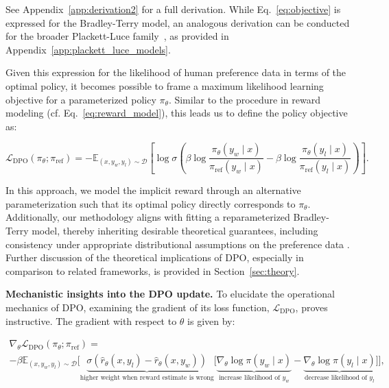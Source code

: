 See Appendix~\ref{app:derivation2} for a full derivation. While Eq.~\ref{eq:objective} is expressed for the Bradley-Terry model, an analogous derivation can be conducted for the broader Plackett-Luce family~\citep{plackett1975analysis, luce2012individual}, as provided in Appendix~\ref{app:plackett_luce_models}.

Given this expression for the likelihood of human preference data in terms of the optimal policy, it becomes possible to frame a maximum likelihood learning objective for a parameterized policy $\pi_\theta$. Similar to the procedure in reward modeling (cf. Eq.~\ref{eq:reward_model}), this leads us to define the policy objective as:

\begin{equation}\label{eq:optimum_model}
    \mathcal{L}_\text{DPO}(\pi_{\theta}; \pi_\text{ref}) = -\mathbb{E}_{(x, y_w, y_l)\sim \mathcal{D}}\left[\log \sigma \left(\beta \log \frac{\pi_{\theta}(y_w\mid x)}{\pi_\text{ref}(y_w\mid x)} - \beta \log \frac{\pi_{\theta}(y_l\mid x)}{\pi_\text{ref}(y_l\mid x)}\right)\right].
\end{equation}

In this approach, we model the implicit reward through an alternative parameterization such that its optimal policy directly corresponds to $\pi_\theta$. Additionally, our methodology aligns with fitting a reparameterized Bradley-Terry model, thereby inheriting desirable theoretical guarantees, including consistency under appropriate distributional assumptions on the preference data \cite{bong2022generalized}. Further discussion of the theoretical implications of DPO, especially in comparison to related frameworks, is provided in Section~\ref{sec:theory}.

\textbf{Mechanistic insights into the DPO update.} To elucidate the operational mechanics of DPO, examining the gradient of its loss function, $\mathcal{L}_\text{DPO}$, proves instructive. The gradient with respect to $\theta$ is given by:

\begin{multline*}\label{eq:gradient}
    \nabla_\theta \mathcal{L}_\text{DPO}(\pi_\theta;\pi_\text{ref}) = \\ -\beta\mathbb{E}_{(x, y_w, y_l) \sim \mathcal{D}} \bigg[\underbrace{\sigma(\hat{r}_\theta(x, y_l) - \hat{r}_\theta (x, y_w))}_\text{higher weight when reward estimate is wrong}\bigg[\underbrace{\nabla_\theta\log \pi(y_w \mid x)}_\text{increase likelihood of $y_w$} - \underbrace{\nabla_\theta\log\pi(y_l \mid x)}_\text{decrease likelihood of $y_l$}\bigg]\bigg],
\end{multline*}


